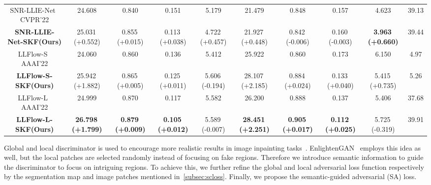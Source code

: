 \documentclass[10pt,twocolumn,letterpaper]{article}
\begin{document}
\begin{table*}[ht]
{\begin{tabular}{c|c|c|c|c|c|c|c|c|c}
    \midrule
    \midrule
    SNR-LLIE-Net~\cite{xu2022snr} \scriptsize CVPR'22 & 24.608  & 0.840  & 0.151  & 5.179   & 21.479  & 0.848  & 0.157     & 4.623     & 39.13 \\ \textbf{SNR-LLIE-Net-SKF(Ours)} & 25.031\,\footnotesize \textcolor{green1}{(+0.552)} & 0.855\,\footnotesize \textcolor{green1}{(+0.015)} & 0.113\,\footnotesize \textcolor{green1}{(+0.038)} & 4.722\,\footnotesize \textcolor{green1}{(+0.457)} & 21.927\,\footnotesize \textcolor{green1}{(+0.448)} & 0.842\,\footnotesize \textcolor{red1}{(-0.006)} & 0.160\,\footnotesize \textcolor{red1}{(-0.003)} & \textbf{3.963}\,\footnotesize \textcolor{green1}{\textbf{(+0.660)}} & 39.44  \\
    \midrule
    \midrule
    LLFlow-S~\cite{wang2022llflow} \scriptsize AAAI'22 & 24.060  & 0.860  & 0.136  & 5.412  & 25.922  & 0.860  & 0.173  & 6.150  & 4.97  \\ \textbf{LLFlow-S-SKF(Ours)} & 25.942\,\footnotesize \textcolor{green1}{(+1.882)} & 0.865\,\footnotesize \textcolor{green1}{(+0.005)} & 0.125\,\footnotesize \textcolor{green1}{(+0.011)} & 5.606\,\footnotesize \textcolor{red1}{(-0.194)} & 28.107\,\footnotesize \textcolor{green1}{(+2.185)} & 0.884\,\footnotesize \textcolor{green1}{(+0.024)} & 0.133\,\footnotesize \textcolor{green1}{(+0.040)} & 5.415\,\footnotesize \textcolor{green1}{(+0.735)} & 5.26  \\
    \midrule
    \midrule
    LLFlow-L~\cite{wang2022llflow} \scriptsize AAAI'22 & 24.999  & 0.870  & 0.117  & 5.582  & 26.200  & 0.888  & 0.137  & 5.406  & 37.68  \\ \textbf{LLFlow-L-SKF(Ours)} & \textbf{26.798}\,\footnotesize \textcolor{green1}{\textbf{(+1.799)}} & \textbf{0.879}\,\footnotesize \textcolor{green1}{\textbf{(+0.009)}} & \textbf{0.105}\,\footnotesize \textcolor{green1}{\textbf{(+0.012)}} & 5.589\,\footnotesize \textcolor{red1}{(-0.007)} & \textbf{28.451}\,\footnotesize \textcolor{green1}{\textbf{(+2.251)}} & \textbf{0.905}\,\footnotesize \textcolor{green1}{\textbf{(+0.017)}} & \textbf{0.112}\,\footnotesize \textcolor{green1}{\textbf{(+0.025)}} & 5.725\,\footnotesize \textcolor{red1}{(-0.319)} & 39.91  \\
    \bottomrule
    \end{tabular}}
  \label{tab:lollolv2}\vspace{-0.3cm}
\end{table*}

Global and local discriminator is used to encourage more realistic results in image inpainting tasks~\cite{li2017generative,iizuka2017globally}. EnlightenGAN~\cite{jiang2021enlightengan} employs this idea as well, but the local patches are selected randomly instead of focusing on fake regions. Therefore we introduce semantic information to guide the discriminator to focus on intriguing regions. To achieve this, we further refine the global and local adversarial loss function respectively by the segmentation map  and image patches  mentioned in~\cref{subsec:scloss}. Finally, we propose the semantic-guided adversarial (SA) loss.
\end{document}
